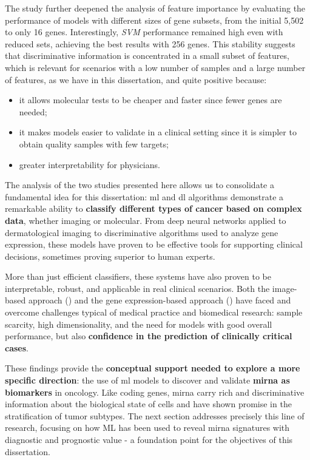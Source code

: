 The study further deepened the analysis of feature importance by evaluating the
performance of models with different sizes of gene subsets, from the initial
5,502 to only 16 genes. Interestingly, \textit{SVM} performance remained high
even with reduced sets, achieving the best results with 256 genes. This
stability suggests that discriminative information is concentrated in a small
subset of features, which is relevant for scenarios with a low number of
samples and a large number of features, as we have in this dissertation, and
quite positive because:

\begin{itemize}
  \item it allows molecular tests to be cheaper and faster since fewer genes are
        needed;
  \item it makes models easier to validate in a clinical setting since it is simpler to
        obtain quality samples with few targets;
  \item greater interpretability for physicians.
\end{itemize}

The analysis of the two studies presented here allows us to consolidate a
fundamental idea for this dissertation: \gls{ml} and \gls{dl} algorithms
demonstrate a remarkable ability to \textbf{classify different types of cancer
  based on complex data}, whether imaging or molecular. From deep neural networks
applied to dermatological imaging to discriminative algorithms used to analyze
gene expression, these models have proven to be effective tools for supporting
clinical decisions, sometimes proving superior to human experts.

More than just efficient classifiers, these systems have also proven to be
interpretable, robust, and applicable in real clinical scenarios. Both the
image-based approach (\cite{ai_in_dermacancer_esteva2017}) and the gene
expression-based approach (\cite{bca_subtypes_with_ml_Wu_2021}) have faced and
overcome challenges typical of medical practice and biomedical research: sample
scarcity, high dimensionality, and the need for models with good overall
performance, but also \textbf{confidence in the prediction of clinically
  critical cases}.

These findings provide the \textbf{conceptual support needed to explore a more
  specific direction}: the use of \gls{ml} models to discover and validate
\textbf{\gls{mirna} as biomarkers} in oncology. Like coding genes, \gls{mirna}
carry rich and discriminative information about the biological state of cells
and have shown promise in the stratification of tumor subtypes. The next
section addresses precisely this line of research, focusing on how ML has been
used to reveal \gls{mirna} signatures with diagnostic and prognostic value - a
foundation point for the objectives of this dissertation.


